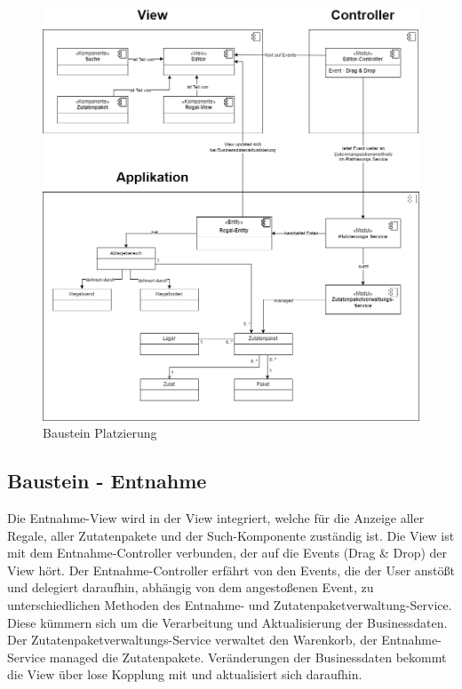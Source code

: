 \begin{figure}[H]
    \centering
    \includegraphics[width=1\textwidth]{Bilder/Kapitel/Bausteinsicht/Baustein_Platzierung}
    \caption{Baustein Platzierung}
    \label{fig:Baustein_Platzierung}
\end{figure}

\subsection{Baustein - Entnahme}
Die Entnahme-View wird in der View integriert, welche für die Anzeige aller Regale, aller Zutatenpakete und der
Such-Komponente zuständig ist. Die View ist mit dem Entnahme-Controller verbunden, der auf die Events (Drag \& Drop)
der View hört. Der Entnahme-Controller erfährt von den Events, die der User anstößt und delegiert daraufhin,
abhängig von dem angestoßenen Event, zu unterschiedlichen Methoden des Entnahme- und Zutatenpaketverwaltung-Service.
Diese kümmern sich um die Verarbeitung und Aktualisierung der Businessdaten. Der Zutatenpaketverwaltungs-Service
verwaltet den Warenkorb, der Entnahme-Service managed die Zutatenpakete. Veränderungen der Businessdaten bekommt die
View über lose Kopplung mit und aktualisiert sich daraufhin.

